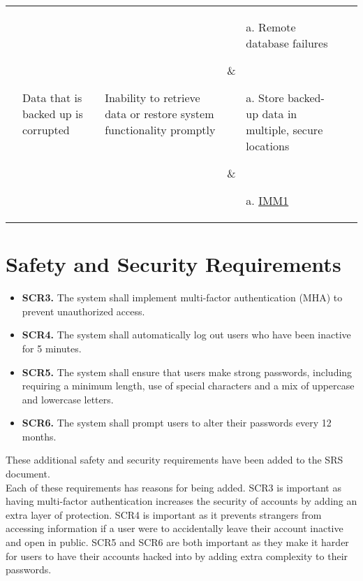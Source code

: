 \documentclass{article}
\begin{document}
\begin{landscape}
\begin{table}
\begin{tabular}{|p{2.5cm}|p{3cm}|p{3cm}|p{5cm}|p{5cm}|p{2cm}|}
&
\parbox[t]{3cm}{\raggedright Data that is backed up is corrupted} &
\parbox[t]{3cm}{\raggedright Inability to retrieve data or restore system functionality promptly} &
\parbox[t]{5cm}{\raggedright
    \begin{enumerate}
      \item[a.] Remote database failures
    \end{enumerate}
  } &
\parbox[t]{5cm}{\raggedright
    \begin{enumerate}
      \item[a.] Store backed-up data in multiple, secure locations
    \end{enumerate}
  } &
\parbox[t]{2cm}{\raggedright
    \begin{enumerate}
        \item[a.] \href{https://github.com/ausbennett/mes-finance-platform/blob/main/docs/SRS/SRS.tex\#L750}{IMM1}
    \end{enumerate}
} \\ \hline

\end{tabular}
\end{table}


\end{landscape}





\section{Safety and Security Requirements}
\begin{itemize}
    \item \textbf{SCR3.} The system shall implement multi-factor authentication (MHA) to prevent unauthorized access.
    \item \textbf{SCR4.} The system shall automatically log out users who have been inactive for 5 minutes.
    \item \textbf{SCR5.} The system shall ensure that users make strong passwords, including requiring a minimum length, use of special characters and a mix of uppercase and lowercase letters.
    \item \textbf{SCR6.} The system shall prompt users to alter their passwords every 12 months.
\end{itemize}
These additional safety and security requirements have been added to the SRS document. \\

Each of these requirements has reasons for being added. SCR3 is important as having multi-factor authentication increases the security of accounts by adding an extra layer of protection. SCR4 is important as it prevents strangers from accessing information if a user were to accidentally leave their account inactive and open in public. SCR5 and SCR6 are both important as they make it harder for users to have their accounts hacked into by adding extra complexity to their passwords.
\end{document}
